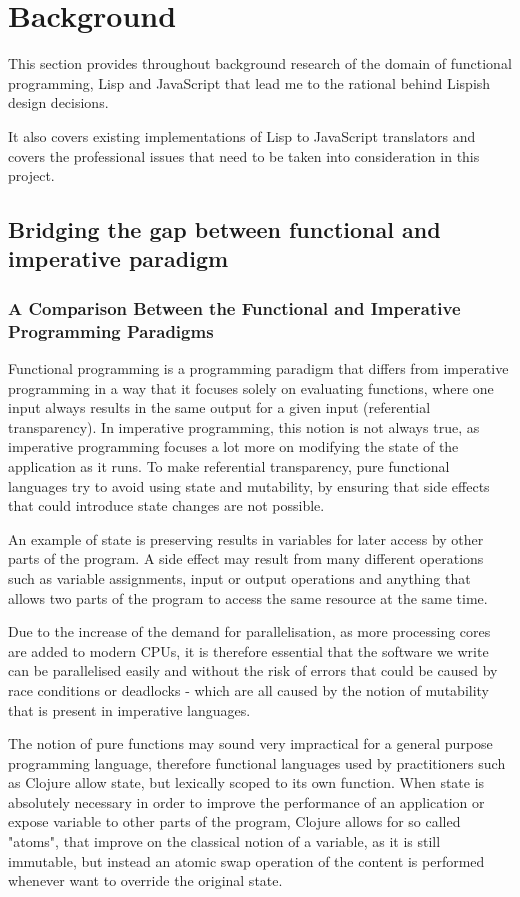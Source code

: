 \chapter{Background}
This section provides throughout background research of the domain of functional programming, Lisp and JavaScript that lead me to the rational behind Lispish design decisions. 

It also covers existing implementations of Lisp to JavaScript translators and covers the professional issues that need to be taken into consideration in this project. 

\section{Bridging the gap between functional and imperative paradigm}

\subsection{A Comparison Between the Functional and Imperative Programming Paradigms}
Functional programming is a programming paradigm that differs from imperative programming in a way that it focuses solely on evaluating functions, where one input always results in the same output for a given input (referential transparency). In imperative programming, this notion is not always true, as imperative programming focuses a lot more on modifying the state of the application as it runs. To make referential transparency, pure functional languages try to avoid using state and mutability, by ensuring that side effects that could introduce state changes are not possible.

An example of state is preserving results in variables for later access by other parts of the program. A side effect may result from many different operations such as variable assignments, input or output operations and anything that allows two parts of the program to access the same resource at the same time.

Due to the increase of the demand for parallelisation, as more processing cores are added to modern CPUs, it is therefore essential that the software we write can be parallelised easily and without the risk of errors that could be caused by race conditions or deadlocks - which are all caused by the notion of mutability that is present in imperative languages.

The notion of pure functions may sound very impractical for a general purpose programming language, therefore functional languages used by practitioners such as Clojure allow state, but lexically scoped to its own function.
When state is absolutely necessary in order to improve the performance of an application or expose variable to other parts of the program, Clojure allows for so called "atoms", that improve on the classical notion of a variable, as it is still immutable, but instead an atomic swap operation of the content is performed whenever want to override the original state.

